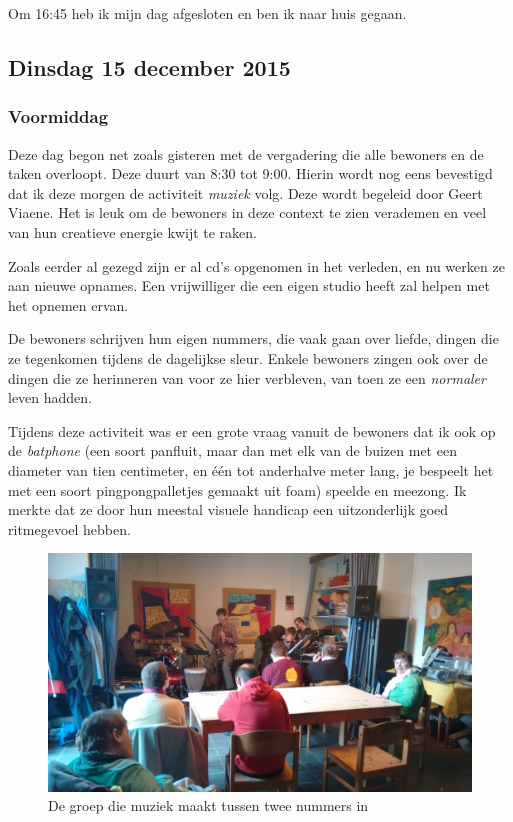 \documentclass[a4paper,12pt]{article}
\begin{document}
Om 16:45 heb ik mijn dag afgesloten en ben ik naar huis gegaan.

\subsection{Dinsdag 15 december 2015}

\subsubsection{Voormiddag}

Deze dag begon net zoals gisteren met de vergadering die alle bewoners en de taken overloopt. Deze duurt van 8:30 tot 9:00. Hierin wordt nog eens bevestigd dat ik deze morgen de activiteit \emph{muziek} volg. Deze wordt begeleid door Geert Viaene. Het is leuk om de bewoners in deze context te zien verademen en veel van hun creatieve energie kwijt te raken.

Zoals eerder al gezegd zijn er al cd's opgenomen in het verleden, en nu werken ze aan nieuwe opnames. Een vrijwilliger die een eigen studio heeft zal helpen met het opnemen ervan.

De bewoners schrijven hun eigen nummers, die vaak gaan over liefde, dingen die ze tegenkomen tijdens de dagelijkse sleur. Enkele bewoners zingen ook over de dingen die ze herinneren van voor ze hier verbleven, van toen ze een \emph{normaler} leven hadden.

Tijdens deze activiteit was er een grote vraag vanuit de bewoners dat ik ook op de \emph{batphone} (een soort panfluit, maar dan met elk van de buizen met een diameter van tien centimeter, en één tot anderhalve meter lang, je bespeelt het met een soort pingpongpalletjes gemaakt uit foam) speelde en meezong. Ik merkte dat ze door hun meestal visuele handicap een uitzonderlijk goed ritmegevoel hebben.

\begin{figure}[H]
  \centering
  \includegraphics[width=\textwidth]{./muziek.jpg}
  \caption{De groep die muziek maakt tussen twee nummers in}
\end{figure}
\end{document}
